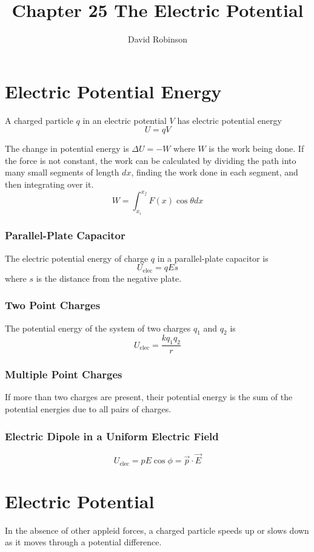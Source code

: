 \documentclass{article}
\title{Chapter 25 The Electric Potential}
\author{David Robinson}
\date{}
\begin{document}
\maketitle

\section*{Electric Potential Energy}
A charged particle $q$ in an electric potential $V$ has electric potential energy \[U=qV\]

The change in potential energy is $\Delta U=-W$ where $W$ is the work being done. If the force is
not constant, the work can be calculated by dividing the path into many small segments of length
$dx$, finding the work done in each segment, and then integrating over it.
\[W=\int_{x_i}^{x_f}F(x)\cos\theta dx\]

\subsubsection*{Parallel-Plate Capacitor}
The electric potential energy of charge $q$ in a parallel-plate capacitor is
\[U_\text{elec}=qEs\] where $s$ is the distance from the negative plate.

\subsubsection*{Two Point Charges}
The potential energy of the system of two charges $q_1$ and $q_2$ is
\[U_\text{elec}=\frac{kq_1 q_2}{r}\]

\subsubsection*{Multiple Point Charges}
If more than two charges are present, their potential energy is the sum of the potential energies
due to all pairs of charges.

\subsubsection*{Electric Dipole in a Uniform Electric Field}
\[U_\text{elec}=pE\cos\phi=\vec{p}\cdot \vec{E}\]

\section*{Electric Potential}
In the absence of other appleid forces, a charged particle speeds up or slows down as it moves
through a potential difference. 
\end{document}
